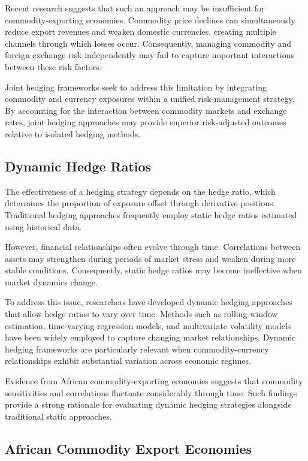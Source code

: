 \documentclass{article}
\begin{document}
Recent research suggests that such an approach may be insufficient for commodity-exporting economies. Commodity price declines can simultaneously reduce export revenues and weaken domestic currencies, creating multiple channels through which losses occur. Consequently, managing commodity and foreign exchange risk independently may fail to capture important interactions between these risk factors.

Joint hedging frameworks seek to address this limitation by integrating commodity and currency exposures within a unified risk-management strategy. By accounting for the interaction between commodity markets and exchange rates, joint hedging approaches may provide superior risk-adjusted outcomes relative to isolated hedging methods.

\subsection{Dynamic Hedge Ratios}

The effectiveness of a hedging strategy depends on the hedge ratio, which determines the proportion of exposure offset through derivative positions. Traditional hedging approaches frequently employ static hedge ratios estimated using historical data.

However, financial relationships often evolve through time. Correlations between assets may strengthen during periods of market stress and weaken during more stable conditions. Consequently, static hedge ratios may become ineffective when market dynamics change.

To address this issue, researchers have developed dynamic hedging approaches that allow hedge ratios to vary over time. Methods such as rolling-window estimation, time-varying regression models, and multivariate volatility models have been widely employed to capture changing market relationships. Dynamic hedging frameworks are particularly relevant when commodity-currency relationships exhibit substantial variation across economic regimes.

Evidence from African commodity-exporting economies suggests that commodity sensitivities and correlations fluctuate considerably through time. Such findings provide a strong rationale for evaluating dynamic hedging strategies alongside traditional static approaches.

\subsection{African Commodity Export Economies}
\end{document}
